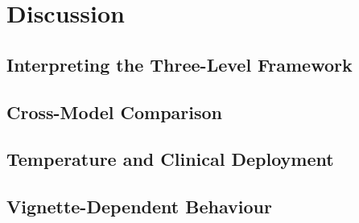 \chapter{Discussion}
\label{chap:discussion}

\section{Interpreting the Three-Level Framework}
\label{sec:disc-framework-interpretation}

\section{Cross-Model Comparison}
\label{sec:disc-models}

\section{Temperature and Clinical Deployment}
\label{sec:disc-temperature}

\section{Vignette-Dependent Behaviour}
\label{sec:disc-vignettes}

